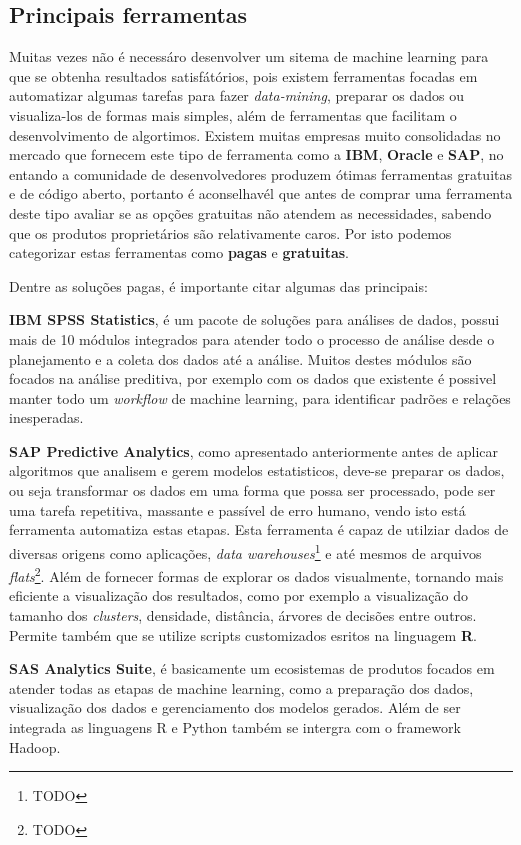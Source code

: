 \subsection{Principais ferramentas}
\label{subsec:ferramentas}
Muitas vezes não é necessáro desenvolver um sitema de machine learning para que se obtenha resultados satisfátórios, pois existem
ferramentas focadas em automatizar algumas tarefas para fazer \textit{data-mining}, preparar os dados ou visualiza-los de formas mais 
simples, além de ferramentas que facilitam o desenvolvimento de algortimos. Existem muitas empresas muito consolidadas no mercado 
que fornecem este tipo de ferramenta como a \textbf{IBM}, \textbf{Oracle} e \textbf{SAP}, no entando a comunidade de desenvolvedores
produzem ótimas ferramentas gratuitas e de código aberto, portanto é aconselhavél que antes de comprar uma ferramenta deste tipo
avaliar se as opções gratuitas não atendem as necessidades, sabendo que os produtos proprietários são relativamente caros. Por 
isto podemos categorizar estas ferramentas como \textbf{pagas} e \textbf{gratuitas}.


Dentre as soluções pagas, é importante citar algumas das principais:

\begin{alineas}
	\item \textbf{IBM SPSS Statistics}, é um pacote de soluções para análises de dados, possui mais de 10 módulos integrados para 
	atender todo o processo de análise desde o planejamento e a coleta dos dados até a análise. Muitos destes módulos são focados na análise
	preditiva, por exemplo com os dados que existente é possivel manter todo um \textit{workflow} de machine learning, para identificar padrões e relações 
	inesperadas.

	\item \textbf{SAP Predictive Analytics}, como apresentado anteriormente antes de aplicar algoritmos que analisem e gerem modelos estatisticos, deve-se 
	preparar os dados, ou seja transformar os dados em uma forma que possa ser processado, pode ser uma tarefa repetitiva, massante e passível de erro humano, 
	vendo isto está ferramenta automatiza estas etapas. Esta ferramenta é capaz de utilziar dados de diversas origens como aplicações, 
	\textit{data warehouses}\footnote{TODO} e até mesmos de arquivos \textit{flats}\footnote{TODO}. 
	Além de fornecer formas de explorar os dados visualmente, tornando mais eficiente a visualização dos resultados, como por exemplo a visualização 
	do tamanho dos \textit{clusters}, densidade, distância, árvores de decisões entre outros. Permite também que se utilize scripts customizados 
	esritos na linguagem \textbf{R}.

	\item \textbf{SAS Analytics Suite}, é basicamente um ecosistemas de produtos focados em atender todas as etapas de machine learning, como a preparação
	dos dados, visualização dos dados e gerenciamento dos modelos gerados. Além de ser integrada as linguagens R e Python também se intergra com o framework
	Hadoop.	
\end{alineas}

